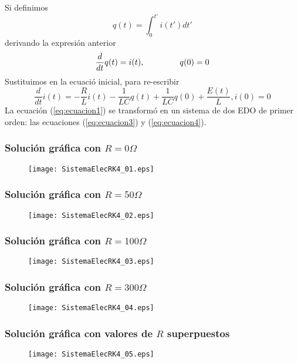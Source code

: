 \begin{frame}
Si definimos
\begin{equation}\label{eq:ecuacion2}
	q(t) = \int_{0}^{t'} i(t') dt'
\end{equation}
derivando la expresi\'{o}n anterior
\begin{equation}\label{eq:ecuacion3}
	\dfrac{d}{dt}q(t) = i(t), \hspace{1.5cm} q(0)=0
\end{equation}
Sustituimos en la ecuaci\'{o} inicial, para re-escribir
\fontsize{12}{12}\selectfont
\begin{equation}\label{eq:ecuacion4}
	\dfrac{d}{dt}i(t) = -\dfrac{R}{L}i(t) - \dfrac{1}{LC} q(t) + \dfrac{1}{LC}q(0) + \dfrac{E(t)}{L}, i(0)=0 
\end{equation}
La ecuaci\'{o}n (\ref{eq:ecuacion1}) se transform\'{o} en un sistema de dos EDO de primer orden: las ecuaciones (\ref{eq:ecuacion3}) y (\ref{eq:ecuacion4}).
\end{frame}
\begin{frame}
\frametitle{Soluci\'{o}n gr\'{a}fica con $R=0 \Omega$}
\begin{figure}
	\centering
	\texttt{[image: SistemaElecRK4\_01.eps]} 
\end{figure}
\end{frame}
\begin{frame}
\frametitle{Soluci\'{o}n gr\'{a}fica con $R=50 \Omega$}
\begin{figure}
	\centering
	\texttt{[image: SistemaElecRK4\_02.eps]} 
\end{figure}
\end{frame}
\begin{frame}
\frametitle{Soluci\'{o}n gr\'{a}fica con $R=100 \Omega$}
\begin{figure}
	\centering
	\texttt{[image: SistemaElecRK4\_03.eps]} 
\end{figure}
\end{frame}
\begin{frame}
\frametitle{Soluci\'{o}n gr\'{a}fica con $R=300 \Omega$}
\begin{figure}
	\centering
	\texttt{[image: SistemaElecRK4\_04.eps]} 
\end{figure}
\end{frame}
\begin{frame}
\frametitle{Soluci\'{o}n gr\'{a}fica con valores de $R$ superpuestos}
\begin{figure}
	\centering
	\texttt{[image: SistemaElecRK4\_05.eps]} 
\end{figure}
\end{frame}
